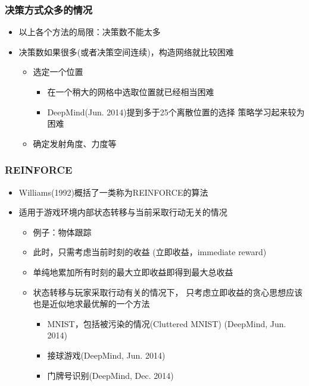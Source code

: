\documentclass[10pt,CJK]{beamer}
\begin{document}
	\begin{frame}
		\frametitle{决策方式众多的情况}
		\begin{itemize}
			\item 以上各个方法的局限：决策数不能太多\pause
			\item 决策数如果很多(或者决策空间连续)，构造网络就比较困难\pause
			\begin{itemize}
				\item 选定一个位置\pause
				\begin{itemize}
					\item 在一个稍大的网格中选取位置就已经相当困难
					\item DeepMind(Jun. 2014)提到多于25个离散位置的选择
					策略学习起来较为困难
				\end{itemize}\pause
				\item 确定发射角度、力度等\pause
			\end{itemize}
		\end{itemize}
	\end{frame}
	
	\begin{frame}
		\frametitle{REINFORCE}
		\begin{itemize}
			\item Williams(1992)概括了一类称为REINFORCE的算法
			\item 适用于游戏环境内部状态转移与当前采取行动无关的情况
			\pause
			\begin{itemize}
				\item 例子：物体跟踪
				\item 此时，只需考虑当前时刻的收益
				(立即收益，immediate reward)
				\item 单纯地累加所有时刻的最大立即收益即得到最大总收益\pause
				\item 状态转移与玩家采取行动有关的情况下，
				只考虑立即收益的贪心思想应该也是近似地求最优解的一个方法
				\begin{itemize}
					\item MNIST，包括被污染的情况(Cluttered MNIST)
					(DeepMind, Jun. 2014)
					\item 接球游戏(DeepMind, Jun. 2014)
					\item 门牌号识别(DeepMind, Dec. 2014)
				\end{itemize}
			\end{itemize}
		\end{itemize}
	\end{frame}
	
\end{document}
